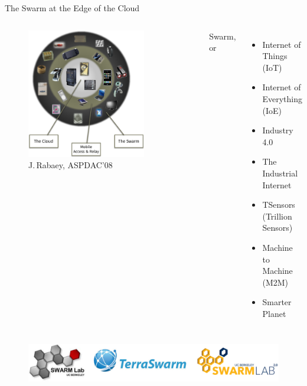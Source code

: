\begin{frame}{The Swarm at the Edge of the Cloud}
  \vspace{1em}
  \begin{columns}
    \begin{figure}
      \includegraphics[width=0.8\textwidth]{figures/swarm_jan.pdf}
      \caption{J.\,Rabaey, ASPDAC'08}
    \end{figure}

    \pause

    Swarm, or
    \begin{itemize}
    \item \alert<4>{Internet of Things (IoT)}
    \item Internet of Everything (IoE)
    \item Industry 4.0
    \item The Industrial Internet
    \item TSensors (Trillion Sensors)
    \item Machine to Machine (M2M)
    \item Smarter Planet
    \end{itemize}

  \end{columns}
  \pause
  \begin{figure}
    \includegraphics[width=\textwidth]{figures/swarmlogo.pdf}
  \end{figure}
\end{frame}

